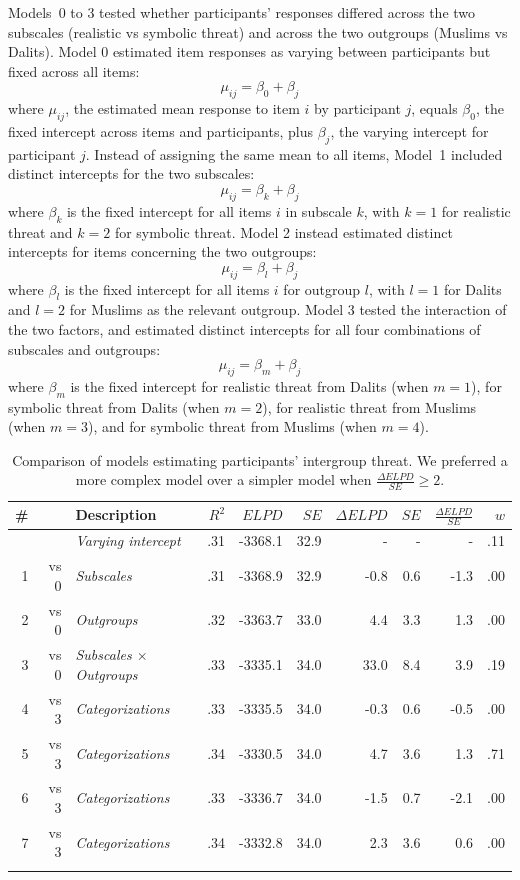 \documentclass[12pt, a4paper]{article}
\begin{document}
Models~0 to 3 tested whether participants' responses differed across the two subscales (realistic vs symbolic threat) and across the two outgroups (Muslims vs Dalits).  Model 0 estimated item responses as varying between participants but fixed across all items: $$ \mu_{ij} = \beta_0 + \beta_{j} $$ where $\mu_{ij}$, the estimated mean response to item $i$ by participant $j$, equals $\beta_0$, the fixed intercept across items and participants, plus $\beta_j$, the varying intercept for participant $j$. Instead of assigning the same mean to all items, Model~1 included distinct intercepts for the two subscales: $$ \mu_{ij} = \beta_k + \beta_{j} $$ where $\beta_k$ is the fixed intercept for all items $i$ in subscale $k$, with $k = 1$ for realistic threat and $k = 2$ for symbolic threat. Model 2 instead estimated distinct intercepts for items concerning the two outgroups: $$ \mu_{ij} = \beta_l + \beta_{j} $$ where $\beta_l$ is the fixed intercept for all items $i$ for outgroup $l$, with $l = 1$ for Dalits and $l = 2$ for Muslims as the relevant outgroup. Model 3 tested the interaction of the two factors, and estimated distinct intercepts for all four combinations of subscales and outgroups: $$ \mu_{ij} = \beta_m + \beta_{j} $$ where $\beta_m$ is the fixed intercept for realistic threat from Dalits (when $m = 1$), for symbolic threat from Dalits (when $m = 2$), for realistic threat from Muslims (when $m = 3$), and for symbolic threat from Muslims (when $m = 4$). 

\begin{table}
\centering
{}
\caption[Model comparison for intergroup threat]{Comparison of models estimating participants' intergroup threat. We preferred a more complex model over a simpler model when $\frac{\Delta\textit{ELPD}}{\textit{SE}} \geq 2$.}
\small	
\begin{tabularx}{\linewidth}{r@{~}rXrrrrrrr} \toprule
\# &  &  Description &  $R^2$ & $\textit{ELPD}$ & $\textit{SE}$ & $\Delta\textit{ELPD}$ & $\textit{SE}$ & $\frac{\Delta\textit{ELPD}}{\textit{SE}}$ & $w$ \\ \midrule \addlinespace
0 &      & \textit{Varying intercept} & .31 & -3368.1 & 32.9 & - & - & - & .11 \\
1 & vs 0 & \textit{Subscales}         & .31 & -3368.9 & 32.9 & -0.8 & 0.6 & -1.3 & .00 \\
2 & vs 0 & \textit{Outgroups} & .32 & -3363.7 & 33.0 & 4.4 & 3.3 & 1.3 & .00 \\
3 & vs 0 & \textit{Subscales $\times$ Outgroups} & .33 & -3335.1 & 34.0 & 33.0 & 8.4 & 3.9 & .19 \\ \midrule
4 & vs 3 & \textit{Categorizations}   & .33 & -3335.5 & 34.0 & -0.3 & 0.6 & -0.5 & .00 \\
5 & vs 3 & \textit{Categorizations}   & .34 & -3330.5 & 34.0 & 4.7 & 3.6 & 1.3 & .71 \\
6 & vs 3 & \textit{Categorizations}   & .33 & -3336.7 & 34.0 & -1.5 & 0.7 & -2.1 & .00 \\
7 & vs 3 & \textit{Categorizations}   & .34 & -3332.8 & 34.0 & 2.3 & 3.6 & 0.6 & .00 \\ \addlinespace \bottomrule
\end{tabularx}
\label{tab:d-1}
\end{table}
\end{document}
